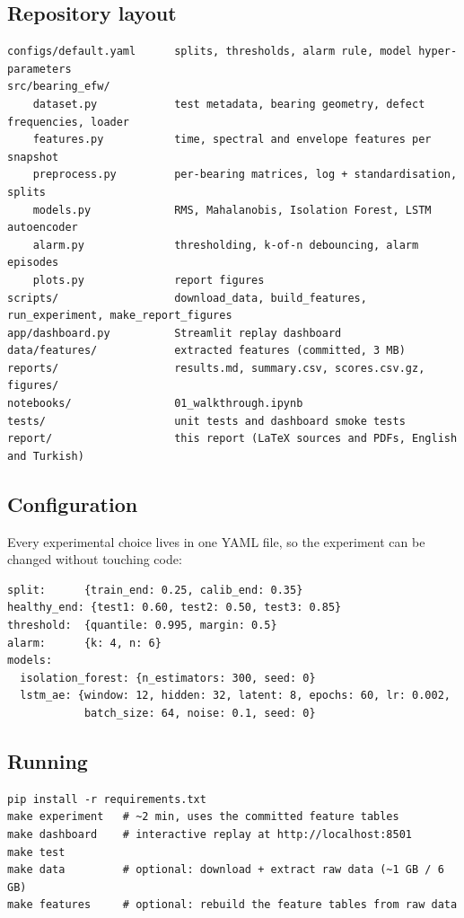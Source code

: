 \documentclass[11pt]{article}
\begin{document}
\subsection{Repository layout}
\begin{lstlisting}[style=plain]
configs/default.yaml      splits, thresholds, alarm rule, model hyper-parameters
src/bearing_efw/
    dataset.py            test metadata, bearing geometry, defect frequencies, loader
    features.py           time, spectral and envelope features per snapshot
    preprocess.py         per-bearing matrices, log + standardisation, splits
    models.py             RMS, Mahalanobis, Isolation Forest, LSTM autoencoder
    alarm.py              thresholding, k-of-n debouncing, alarm episodes
    plots.py              report figures
scripts/                  download_data, build_features, run_experiment, make_report_figures
app/dashboard.py          Streamlit replay dashboard
data/features/            extracted features (committed, 3 MB)
reports/                  results.md, summary.csv, scores.csv.gz, figures/
notebooks/                01_walkthrough.ipynb
tests/                    unit tests and dashboard smoke tests
report/                   this report (LaTeX sources and PDFs, English and Turkish)
\end{lstlisting}

\subsection{Configuration}
Every experimental choice lives in one YAML file, so the experiment can be changed without touching
code:
\begin{lstlisting}[style=plain]
split:      {train_end: 0.25, calib_end: 0.35}
healthy_end: {test1: 0.60, test2: 0.50, test3: 0.85}
threshold:  {quantile: 0.995, margin: 0.5}
alarm:      {k: 4, n: 6}
models:
  isolation_forest: {n_estimators: 300, seed: 0}
  lstm_ae: {window: 12, hidden: 32, latent: 8, epochs: 60, lr: 0.002,
            batch_size: 64, noise: 0.1, seed: 0}
\end{lstlisting}

\subsection{Running}
\begin{lstlisting}[style=plain]
pip install -r requirements.txt
make experiment   # ~2 min, uses the committed feature tables
make dashboard    # interactive replay at http://localhost:8501
make test
make data         # optional: download + extract raw data (~1 GB / 6 GB)
make features     # optional: rebuild the feature tables from raw data
\end{lstlisting}
\end{document}
